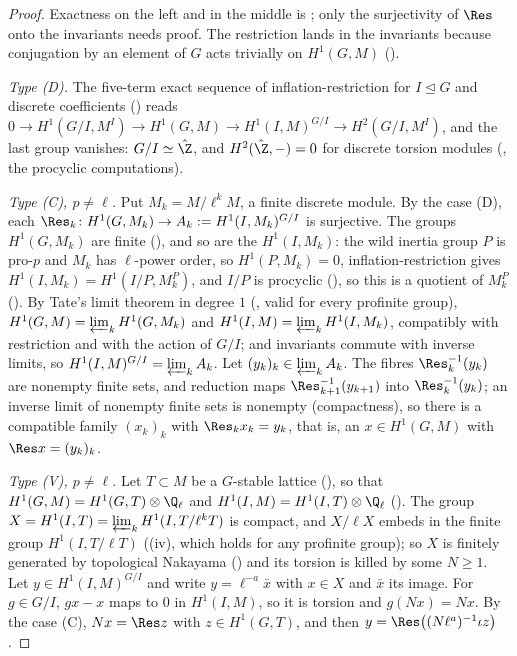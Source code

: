 \begin{proof}
Exactness on the left and in the middle is ; only the surjectivity of $\Res$ onto the invariants needs proof. The restriction lands in the
invariants because conjugation by an element of $G$ acts trivially on $H^1(G,M)$ ().

\emph{Type (D).} The five-term exact sequence of inflation-restriction for $I\trianglelefteq G$ and discrete coefficients () reads
$0\to H^1(G/I,M^I)\to H^1(G,M)\to H^1(I,M)^{G/I}\to H^2(G/I,M^I)$, and the last group vanishes: $G/I\simeq\hat\Z$, and $H^2(\hat\Z,-)=0$ for discrete torsion modules
(, the procyclic computations).

\emph{Type (C), $p\ne\ell$.} Put $M_k=M/\ell^kM$, a finite discrete module. By the case (D), each
$\Res_k\colon H^1(G,M_k)\to A_k:=H^1(I,M_k)^{G/I}$ is surjective. The groups $H^1(G,M_k)$ are finite (), and so are the $H^1(I,M_k)$: the
wild inertia group $P$ is pro-$p$ and $M_k$ has $\ell$-power order, so $H^1(P,M_k)=0$, inflation-restriction gives $H^1(I,M_k)=H^1(I/P,M_k^P)$, and $I/P$ is procyclic
(), so this is a quotient of $M_k^P$ (). By Tate's limit theorem in degree $1$ (, valid for every profinite group),
$H^1(G,M)=\varprojlim_kH^1(G,M_k)$ and $H^1(I,M)=\varprojlim_kH^1(I,M_k)$, compatibly with restriction and with the action of $G/I$; and invariants commute with inverse
limits, so $H^1(I,M)^{G/I}=\varprojlim_kA_k$. Let $(y_k)_k\in\varprojlim_kA_k$. The fibres $\Res_k^{-1}(y_k)$ are nonempty finite sets, and reduction maps
$\Res_{k+1}^{-1}(y_{k+1})$ into $\Res_k^{-1}(y_k)$; an inverse limit of nonempty finite sets is nonempty (compactness), so there is a compatible family $(x_k)_k$ with
$\Res_kx_k=y_k$, that is, an $x\in H^1(G,M)$ with $\Res x=(y_k)_k$.

\emph{Type (V), $p\ne\ell$.} Let $T\subset M$ be a $G$-stable lattice (), so that $H^1(G,M)=H^1(G,T)\otimes\Q_\ell$ and $H^1(I,M)=H^1(I,T)\otimes\Q_\ell$
(). The group $X=H^1(I,T)=\varprojlim_kH^1(I,T/\ell^kT)$ is compact, and $X/\ell X$ embeds in the finite group $H^1(I,T/\ell T)$ ((iv),
which holds for any profinite group); so $X$ is finitely generated by topological Nakayama () and its torsion is killed by some $N\ge1$. Let
$y\in H^1(I,M)^{G/I}$ and write $y=\ell^{-a}\bar x$ with $x\in X$ and $\bar x$ its image. For $g\in G/I$, $gx-x$ maps to $0$ in $H^1(I,M)$, so it is torsion and
$g(Nx)=Nx$. By the case (C), $Nx=\Res z$ with $z\in H^1(G,T)$, and then $y=\Res\bigl((N\ell^a)^{-1}\iota z\bigr)$.
\end{proof}

